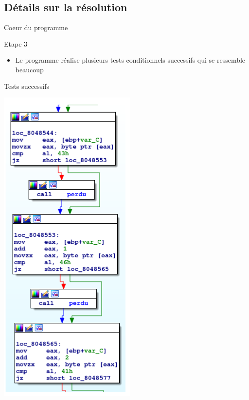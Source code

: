 \documentclass{beamer}
\begin{document}
	\subsection{Détails sur la résolution}

	\begin{frame}{Coeur du programme}
		\begin{block}{Etape 3}
			\begin{itemize}
				\item Le programme réalise plusieurs tests conditionnels successifs qui se ressemble beaucoup
			\end{itemize}
		\end{block}
		\begin{exampleblock}{Tests successifs}
			\begin{center}
				\includegraphics[scale=0.4]{./pictures/114-reversing-3-4.PNG}
			\end{center}
		\end{exampleblock}
	\end{frame}
\end{document}
